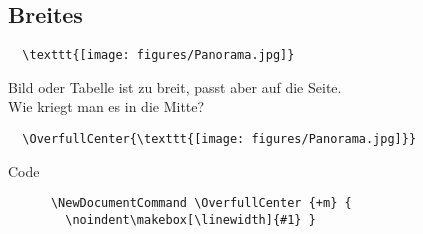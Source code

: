\subsection{Breites}

\begin{frame}[fragile]{}
  \begin{verbatim}
  \texttt{[image: figures/Panorama.jpg]}
  \end{verbatim}
  Bild oder Tabelle ist zu breit, passt aber auf die Seite.\\
  Wie kriegt man es in die Mitte?
  \begin{verbatim}
  \OverfullCenter{\texttt{[image: figures/Panorama.jpg]}}
  \end{verbatim}

  \begin{block}{Code}
    \begin{verbatim}
      \NewDocumentCommand \OverfullCenter {+m} {
        \noindent\makebox[\linewidth]{#1} }
    \end{verbatim}
  \end{block}
\end{frame}

